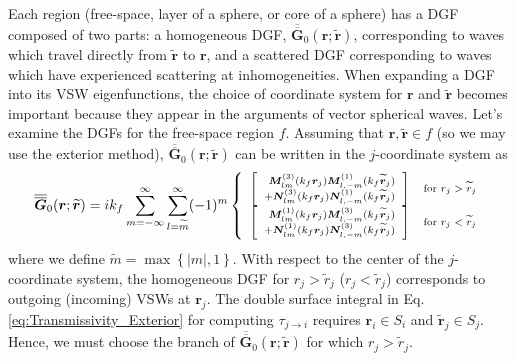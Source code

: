 Each region (free-space, layer of a sphere, or core of a sphere) has a DGF composed of two parts: a homogeneous DGF, $\overline{\overline{\boldsymbol{G}}}_{0}(\boldsymbol{r}; \boldsymbol{\widetilde{r}})$, corresponding to waves which travel directly from $\boldsymbol{\widetilde{r}}$ to $\boldsymbol{r}$, and a scattered DGF corresponding to waves which have experienced scattering at inhomogeneities. When expanding a DGF into its VSW eigenfunctions, the choice of coordinate system for $\boldsymbol{r}$ and $\boldsymbol{\widetilde{r}}$ becomes important because they appear in the arguments of vector spherical waves. Let's examine the DGFs for the free-space region $f$. Assuming that $\boldsymbol{r}, \boldsymbol{\widetilde{r}} \in f$ (so we may use the exterior method), $\overline{\overline{\boldsymbol{G}}}_{0}(\boldsymbol{r}; \boldsymbol{\widetilde{r}})$ can be written in the $j$-coordinate system as
%
\begin{equation}\label{eq:DGF_homogeneous} \scriptsize
\overline{\overline{\boldsymbol{G}}}_{0}(\boldsymbol{r}; \widetilde{\boldsymbol{r}}) = i k_{f} \sum\limits_{m=-\infty}^{\infty} \sum\limits_{l=\widetilde{m}}^{\infty} (-1)^{m}  \left\{ \begin{array}{lll}
\left[ \begin{array}{r} \boldsymbol{M}_{l m}^{(3)}(k_{f} \boldsymbol{r}_{j}) \boldsymbol{M}_{l, -m}^{(1)}(k_{f} \widetilde{\boldsymbol{r}}_{j}) \\+ \boldsymbol{N}_{l m}^{(3)}(k_{f} \boldsymbol{r}_{j}) \boldsymbol{N}_{l, -m}^{(1)}(k_{f} \widetilde{\boldsymbol{r}}_{j}) \end{array} \right]
& \text{for } r_{j} > \widetilde{r}_{j}
\\
\left[ \begin{array}{r} \boldsymbol{M}_{l m}^{(1)}(k_{f} \boldsymbol{r}_{j}) \boldsymbol{M}_{l, -m}^{(3)}(k_{f} \widetilde{\boldsymbol{r}}_{j}) \\+ \boldsymbol{N}_{l m}^{(1)}(k_{f} \boldsymbol{r}_{j}) \boldsymbol{N}_{l, -m}^{(3)}(k_{f} \widetilde{\boldsymbol{r}}_{j}) \end{array} \right]
& \text{for } r_{j} < \widetilde{r}_{j}
\end{array} \right.
\end{equation}
%
where we define $\widetilde{m} = \max{\left\{ \left| m \right|, 1 \right\}}$. With respect to the center of the $j$-coordinate system, the homogeneous DGF for $r_{j} > \widetilde{r}_{j}$ ($r_{j} < \widetilde{r}_{j}$) corresponds to outgoing (incoming) VSWs at $\boldsymbol{r}_{j}$. The double surface integral in Eq. \ref{eq:Transmissivity_Exterior} for computing $\tau_{j \rightarrow i}$ requires $\boldsymbol{r}_{i} \in S_{i}$ and $\widetilde{\boldsymbol{r}}_{j} \in S_{j}$.  Hence, we must choose the branch of $\overline{\overline{\boldsymbol{G}}}_{0}(\boldsymbol{r}; \boldsymbol{\widetilde{r}})$ for which $r_{j} > \widetilde{r}_{j}$.


